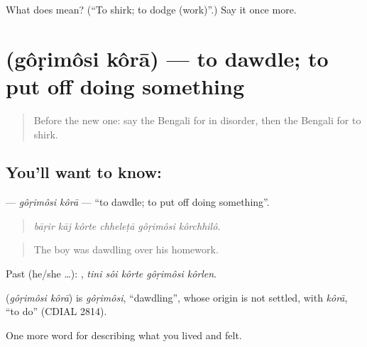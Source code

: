\begin{tcolorbox}[breakable,colback=teal!4,colframe=teal!35!black,title={Before you move on}]
What does   mean? (\textquotedblleft{}To shirk; to dodge (work)\textquotedblright{}.) Say it once more.
\end{tcolorbox}
\section[\texorpdfstring{\bn{গড়িমসি} \bn{করা} (gôṛimôsi kôrā)}{গড়িমসি করা (gôṛimôsi kôrā)}]{  (gôṛimôsi kôrā) — to dawdle; to put off doing something}

\label{lesson:BN-C462-gorimosi-kora}



\begin{quote}
Before the new one: say the Bengali for in disorder, then the Bengali for to shirk.
\end{quote}

\subsection*{You'll want to know:  }
\textbf{ } — \emph{gôṛimôsi kôrā} — \textquotedblleft{}to dawdle; to put off doing something\textquotedblright{}.

\begin{quote}
     
\end{quote}

\begin{quote}
\emph{bāṛir kāj kôrte chheleṭā gôṛimôsi kôrchhilô.}
\end{quote}

\begin{quote}
The boy was dawdling over his homework.
\end{quote}

Past (he/she …):     , \emph{tini sôi kôrte gôṛimôsi kôrlen}.

\begin{cousinweb}
\textbf{ } (\emph{gôṛimôsi kôrā}) is \emph{gôṛimôsi}, \textquotedblleft{}dawdling\textquotedblright{}, whose origin is not settled, with \emph{kôrā}, \textquotedblleft{}to do\textquotedblright{} (CDIAL 2814).
\end{cousinweb}

\begin{grammarlens}[title={What you've built}]
One more word for describing what you lived and felt.
\end{grammarlens}

